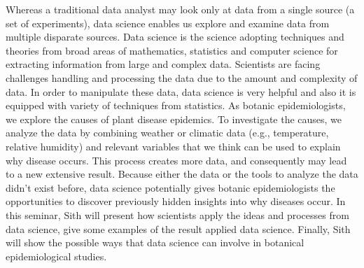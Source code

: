 \documentclass[12pt,a4paper]{article}
\begin{document}
Whereas a traditional data analyst may look only at data from a single source (a set of experiments), data science enables us explore and examine data from multiple disparate sources. Data science is the science adopting techniques and theories from broad areas of mathematics, statistics and computer science for extracting information from large and complex data. Scientists are facing challenges handling and processing the data due to the amount and complexity of data. In order to manipulate these data, data science is very helpful and also it is equipped with variety of techniques from statistics.  As botanic epidemiologists, we explore the causes of plant disease epidemics. To investigate the causes, we analyze the data by combining weather or climatic data (e.g., temperature, relative humidity) and relevant variables that we think can be used to explain why disease occurs. This process creates more data, and consequently may lead to a new extensive result. Because either the data or the tools to analyze the data didn't exist before, data science potentially gives botanic epidemiologists the opportunities to discover previously hidden insights into why diseases occur. In this seminar, Sith will present how scientists apply the ideas and processes from data science, give some examples of the result applied data science. Finally, Sith will show the possible ways that data science can involve in botanical epidemiological studies.
\end{document}

